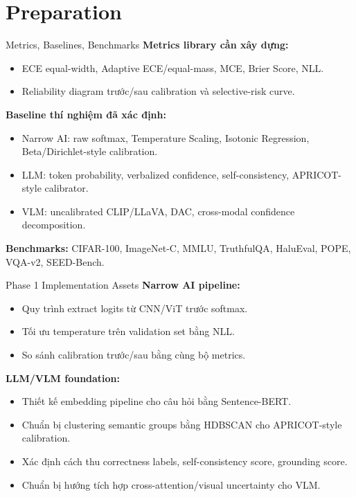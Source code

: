 \documentclass[aspectratio=169]{beamer}
\begin{document}
\section{Preparation}

\begin{frame}{Metrics, Baselines, Benchmarks}
\textbf{Metrics library cần xây dựng:}
\begin{itemize}
\item ECE equal-width, Adaptive ECE/equal-mass, MCE, Brier Score, NLL.
\item Reliability diagram trước/sau calibration và selective-risk curve.
\end{itemize}

\vspace{0.2cm}
\textbf{Baseline thí nghiệm đã xác định:}
\begin{itemize}
\item Narrow AI: raw softmax, Temperature Scaling, Isotonic Regression, Beta/Dirichlet-style calibration.
\item LLM: token probability, verbalized confidence, self-consistency, APRICOT-style calibrator.
\item VLM: uncalibrated CLIP/LLaVA, DAC, cross-modal confidence decomposition.
\end{itemize}

\vspace{0.2cm}
\textbf{Benchmarks:} CIFAR-100, ImageNet-C, MMLU, TruthfulQA, HaluEval, POPE, VQA-v2, SEED-Bench.
\end{frame}

\begin{frame}{Phase 1 Implementation Assets}
\textbf{Narrow AI pipeline:}
\begin{itemize}
\item Quy trình extract logits từ CNN/ViT trước softmax.
\item Tối ưu temperature trên validation set bằng NLL.
\item So sánh calibration trước/sau bằng cùng bộ metrics.
\end{itemize}

\vspace{0.2cm}
\textbf{LLM/VLM foundation:}
\begin{itemize}
\item Thiết kế embedding pipeline cho câu hỏi bằng Sentence-BERT.
\item Chuẩn bị clustering semantic groups bằng HDBSCAN cho APRICOT-style calibration.
\item Xác định cách thu correctness labels, self-consistency score, grounding score.
\item Chuẩn bị hướng tích hợp cross-attention/visual uncertainty cho VLM.
\end{itemize}
\end{frame}
\end{document}
